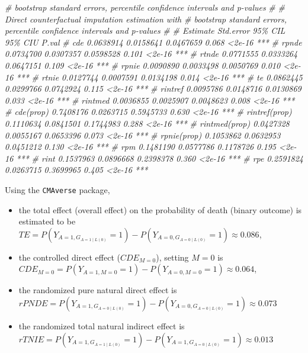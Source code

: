 \documentclass[
]{book}
\newenvironment{Shaded}{\begin{snugshade}}{\end{snugshade}}
\newcommand{\CommentTok}[1]{\textcolor[rgb]{0.56,0.35,0.01}{\textit{#1}}}
\providecommand{\tightlist}{%
  \setlength{\itemsep}{0pt}\setlength{\parskip}{0pt}}
\begin{document}
\begin{Shaded}
\begin{Highlighting}[]
\CommentTok{\# bootstrap standard errors, percentile confidence intervals and p{-}values}
\CommentTok{\#}
\CommentTok{\# Direct counterfactual imputation estimation with}
\CommentTok{\# bootstrap standard errors, percentile confidence intervals and p{-}values}
\CommentTok{\#}
\CommentTok{\#                  Estimate Std.error   95\% CIL 95\% CIU  P.val}
\CommentTok{\#   cde           0.0638914 0.0158641 0.0467659   0.068 \textless{}2e{-}16 *** }
\CommentTok{\#   rpnde         0.0734700 0.0307357 0.0598528   0.101 \textless{}2e{-}16 *** }
\CommentTok{\#   rtnde         0.0771555 0.0333264 0.0647151   0.109 \textless{}2e{-}16 ***}
\CommentTok{\#   rpnie         0.0090890 0.0033498 0.0050769   0.010 \textless{}2e{-}16 ***}
\CommentTok{\#   rtnie         0.0127744 0.0007591 0.0134198   0.014 \textless{}2e{-}16 *** }
\CommentTok{\#   te            0.0862445 0.0299766 0.0742924   0.115 \textless{}2e{-}16 ***}
\CommentTok{\#   rintref       0.0095786 0.0148716 0.0130869   0.033 \textless{}2e{-}16 ***}
\CommentTok{\#   rintmed       0.0036855 0.0025907 0.0048623   0.008 \textless{}2e{-}16 ***}
\CommentTok{\#   cde(prop)     0.7408176 0.0263715 0.5945733   0.630 \textless{}2e{-}16 ***}
\CommentTok{\#   rintref(prop) 0.1110634 0.0841501 0.1744983   0.288 \textless{}2e{-}16 ***}
\CommentTok{\#   rintmed(prop) 0.0427328 0.0055167 0.0653396   0.073 \textless{}2e{-}16 ***}
\CommentTok{\#   rpnie(prop)   0.1053862 0.0632953 0.0451212   0.130 \textless{}2e{-}16 ***}
\CommentTok{\#   rpm           0.1481190 0.0577786 0.1178726   0.195 \textless{}2e{-}16 ***}
\CommentTok{\#   rint          0.1537963 0.0896668 0.2398378   0.360 \textless{}2e{-}16 ***}
\CommentTok{\#   rpe           0.2591824 0.0263715 0.3699965   0.405 \textless{}2e{-}16 ***}
\end{Highlighting}
\end{Shaded}

Using the \texttt{CMAverse} package,

\begin{itemize}
\tightlist
\item
  the total effect (overall effect) on the probability of death (binary outcome) is estimated to be \(TE = P\left(Y_{A=1,G_{A=1\mid L(0)}} = 1\right) - P\left(Y_{A=0,G_{A=0\mid L(0)}} = 1\right) \approx 0.086\),
\item
  the controlled direct effect (\(CDE_{M=0}\)), setting \(M=0\) is \(CDE_{M=0}=P\left(Y_{A=1,M=0} =1 \right) - P\left(Y_{A=0,M=0} = 1 \right)\approx 0.064\),
\item
  the randomized pure natural direct effect is \(rPNDE = P\left(Y_{A=1,G_{A=0\mid L(0)}} = 1 \right) - P\left(Y_{A=0,G_{A=0\mid L(0)}}  = 1\right)\approx 0.073\)
\item
  the randomized total natural indirect effect is \(rTNIE = P\left(Y_{A=1,G_{A=1\mid L(0)}} =1\right) - P\left(Y_{A=1,G_{A=0\mid L(0)}} =1\right)\approx 0.013\)
\end{itemize}
\end{document}

